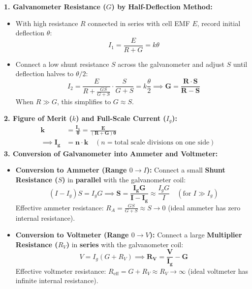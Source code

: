 \documentclass[10pt,twoside,openright]{book}
\begin{document}
\begin{formulabox}
\textbf{1. Galvanometer Resistance ($G$) by Half-Deflection Method:}
\begin{itemize}
  \item With high resistance $R$ connected in series with cell EMF $E$, record initial deflection $\theta$:
  \begin{equation}
    I_1 = \frac{E}{R + G} = k \theta
  \end{equation}
  \item Connect a low shunt resistance $S$ across the galvanometer and adjust $S$ until deflection halves to $\theta/2$:
  \begin{equation}
    I_2 = \frac{E}{R + \frac{GS}{G+S}} \cdot \frac{S}{G+S} = k \frac{\theta}{2} \implies \mathbf{G = \frac{R \cdot S}{R - S}}
  \end{equation}
  When $R \gg G$, this simplifies to $G \approx S$.
\end{itemize}
\textbf{2. Figure of Merit ($k$) and Full-Scale Current ($I_g$):}
\begin{align}
  \mathbf{k} &= \mathbf{\frac{I_1}{\theta} = \frac{E}{(R + G)\theta}} \\
  \implies \mathbf{I_g} &= \mathbf{n \cdot k} \quad (n = \text{total scale divisions on one side}) \nonumber
\end{align}
\textbf{3. Conversion of Galvanometer into Ammeter and Voltmeter:}
\begin{itemize}
  \item \textbf{Conversion to Ammeter (Range $0 \to I$):} Connect a small \textbf{Shunt Resistance ($S$)} in \textbf{parallel} with the galvanometer coil:
  \begin{equation}
    (I - I_g)S = I_g G \implies \mathbf{S = \frac{I_g G}{I - I_g}} \approx \frac{I_g G}{I} \quad (\text{for } I \gg I_g)
  \end{equation}
  Effective ammeter resistance: $R_A = \frac{GS}{G+S} \approx S \to 0$ (ideal ammeter has zero internal resistance).
  \item \textbf{Conversion to Voltmeter (Range $0 \to V$):} Connect a large \textbf{Multiplier Resistance ($R_V$)} in \textbf{series} with the galvanometer coil:
  \begin{equation}
    V = I_g (G + R_V) \implies \mathbf{R_V = \frac{V}{I_g} - G}
  \end{equation}
  Effective voltmeter resistance: $R_{\text{eff}} = G + R_V \approx R_V \to \infty$ (ideal voltmeter has infinite internal resistance).
\end{itemize}
\end{formulabox}
\end{document}
